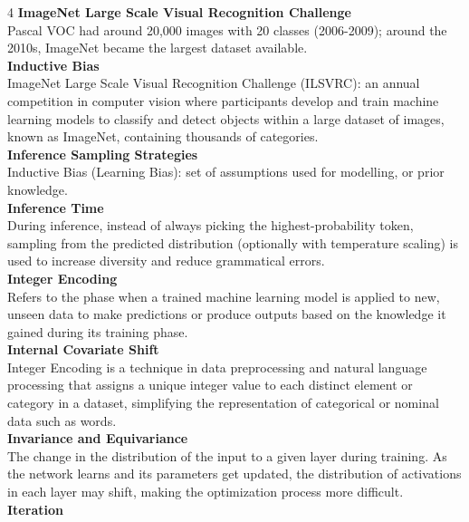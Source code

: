 \documentclass[8pt]{extarticle}
\begin{document}
\begin{multicols}{4}
\vspace{2pt}\textbf{ImageNet Large Scale Visual Recognition Challenge}\\
Pascal VOC had around 20,000 images with 20 classes (2006-2009); around the 2010s, ImageNet became the largest dataset available.\\
\vspace{2pt}\textbf{Inductive Bias}\\
ImageNet Large Scale Visual Recognition Challenge (ILSVRC): an annual competition in computer vision where participants develop and train machine learning models to classify and detect objects within a large dataset of images, known as ImageNet, containing thousands of categories.\\
\vspace{2pt}\textbf{Inference Sampling Strategies}\\
Inductive Bias (Learning Bias): set of assumptions used for modelling, or prior knowledge.\\
\vspace{2pt}\textbf{Inference Time}\\
During inference, instead of always picking the highest-probability token, sampling from the predicted distribution (optionally with temperature scaling) is used to increase diversity and reduce grammatical errors.\\
\vspace{2pt}\textbf{Integer Encoding}\\
Refers to the phase when a trained machine learning model is applied to new, unseen data to make predictions or produce outputs based on the knowledge it gained during its training phase.\\
\vspace{2pt}\textbf{Internal Covariate Shift}\\
Integer Encoding is a technique in data preprocessing and natural language processing that assigns a unique integer value to each distinct element or category in a dataset, simplifying the representation of categorical or nominal data such as words.\\
\vspace{2pt}\textbf{Invariance and Equivariance}\\
The change in the distribution of the input to a given layer during training. As the network learns and its parameters get updated, the distribution of activations in each layer may shift, making the optimization process more difficult.\\
\vspace{2pt}\textbf{Iteration}\\

\end{multicols}
\end{document}
